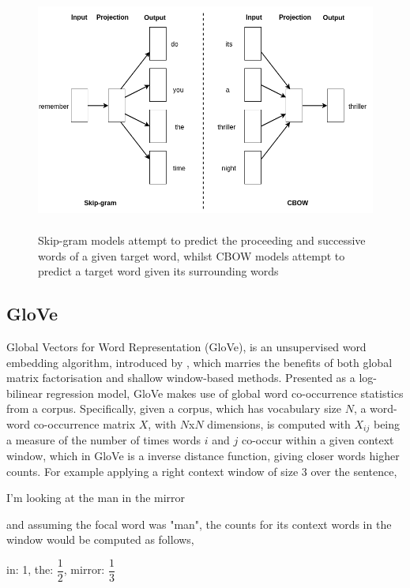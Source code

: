 \noindent
\newline
\begin{figure}[h]
	\includegraphics[width=12cm, height=8cm]{./figures/fig13}
	\centering
	\caption[Skip-gram and CBOW models]{Skip-gram models attempt to predict the proceeding and successive words of a given target word, whilst CBOW models attempt to predict a target word given its surrounding words}
	\label{fig:fig13}
\end{figure}
\subsection{GloVe}
Global Vectors for Word Representation (GloVe), is an unsupervised word embedding algorithm, introduced by \cite{Pennington2014}, which marries the benefits of both global matrix factorisation and shallow window-based methods. Presented as a log-bilinear regression model, GloVe makes use of global word co-occurrence statistics from a corpus. Specifically, given a  corpus, which has vocabulary size \(N\), a word-word co-occurrence matrix \(X\), with \(N\)x\(N\) dimensions, is computed with \(X_{ij}\) being a measure of the number of times words \(i\) and \(j\) co-occur within a given context window, which in GloVe is a inverse distance function, giving closer words higher counts. For example applying a right context window of size 3 over the sentence,

\begin{center}
	I'm looking at the man in the mirror
\end{center}

\noindent
and assuming the focal word was "man", the counts for its context words in the window would be computed as follows,

\begin{center}
	in: 1, \space
	the: \(\dfrac{1}{2}\), \space
	mirror: \(\dfrac{1}{3} \)
\end{center}

